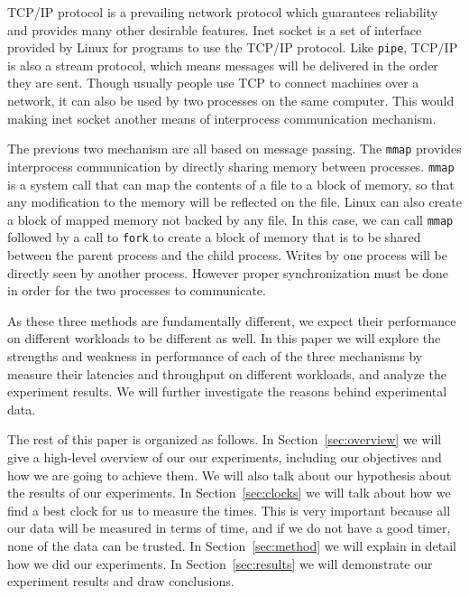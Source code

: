 \documentclass[11pt,conference]{IEEEtran}
\begin{document}
TCP/IP protocol is a prevailing network protocol which guarantees reliability and provides many other desirable features.
Inet socket is a set of interface provided by Linux for programs to use the TCP/IP protocol.
Like \texttt{pipe}, TCP/IP is also a stream protocol, which means messages will be delivered in the order they are sent.
Though usually people use TCP to connect machines over a network, it can also be used by two processes on the same computer.
This would making inet socket another means of interprocess communication mechanism.

The previous two mechanism are all based on message passing.
The \texttt{mmap} provides interprocess communication by directly sharing memory between processes.
\texttt{mmap} is a system call that can map the contents of a file to a block of memory, so that any modification to the memory will be reflected on the file.
Linux can also create a block of mapped memory not backed by any file.
In this case, we can call \texttt{mmap} followed by a call to \texttt{fork} to create a block of memory that is to be shared between the parent process and the child process.
Writes by one process will be directly seen by another process.
However proper synchronization must be done in order for the two processes to communicate.

As these three methods are fundamentally different, we expect their performance on different workloads to be different as well.
In this paper we will explore the strengths and weakness in performance of each of the three mechanisms by measure their latencies and throughput on different workloads, and analyze the experiment results.
We will further investigate the reasons behind experimental data.

The rest of this paper is organized as follows.
In Section~\ref{sec:overview} we will give a high-level overview of our our experiments, including our objectives and how we are going to achieve them.
We will also talk about our hypothesis about the results of our experiments.
In Section~\ref{sec:clocks} we will talk about how we find a best clock for us to measure the times.
This is very important because all our data will be measured in terms of time, and if we do not have a good timer, none of the data can be trusted.
In Section~\ref{sec:method} we will explain in detail how we did our experiments.
In Section~\ref{sec:results} we will demonstrate our experiment results and draw conclusions.
\end{document}
